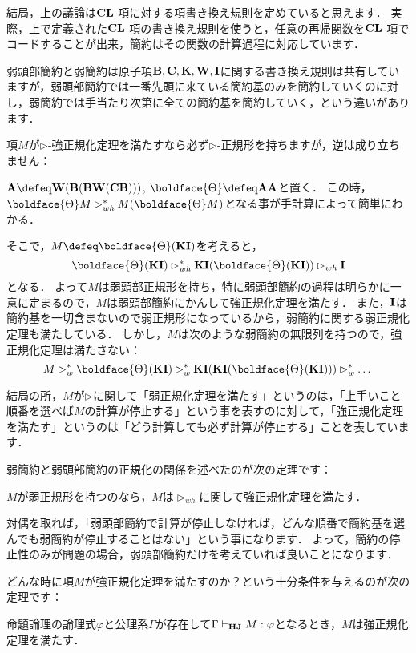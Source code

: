 \documentclass[realisability.tex]{subfiles}
\begin{document}
結局，上の議論は$\mathord{\mathbf{CL}}$-項に対する項書き換え規則を定めていると思えます．
実際，上で定義された$\mathord{\mathbf{CL}}$-項の書き換え規則を使うと，任意の再帰関数を$\mathord{\mathbf{CL}}$-項でコードすることが出来，簡約はその関数の計算過程に対応しています．

弱頭部簡約と弱簡約は原子項$\mathsf{\mathbf{B}}, \mathsf{\mathbf{C}}, \mathsf{\mathbf{K}}, \mathsf{\mathbf{W}}, \mathsf{\mathbf{I}}$に関する書き換え規則は共有していますが，弱頭部簡約では一番先頭に来ている簡約基のみを簡約していくのに対し，弱簡約では手当たり次第に全ての簡約基を簡約していく，という違いがあります．

項$M$が$\rhd$-強正規化定理を満たすなら必ず$\rhd$-正規形を持ちますが，逆は成り立ちません：

\begin{example}
 $\comb{A} \defeq \W(\B(\B\W(\C\B)))$, $\boldface{\Theta} \defeq \comb{A}\comb{A}$と置く．
 この時，$\boldface{\Theta} M \rhd_{wh}^* M (\boldface{\Theta} M)$となる事が手計算によって簡単にわかる．

 そこで，$M \defeq \boldface{\Theta} (\K\I)$を考えると，
 \[
  \boldface{\Theta}(\K\I) \rhd_{wh}^* \K \I (\boldface{\Theta} (\K\I)) \rhd_{wh} \I
 \]
 となる．
 よって$M$は弱頭部正規形を持ち，特に弱頭部簡約の過程は明らかに一意に定まるので，$M$は弱頭部簡約にかんして強正規化定理を満たす．
 また，$\mathsf{\mathbf{I}}$は簡約基を一切含まないので弱正規形になっているから，弱簡約に関する弱正規化定理も満たしている．
 しかし，$M$は次のような弱簡約の無限列を持つので，強正規化定理は満たさない：
 \[
  M \rhd_{w}^* \boldface{\Theta}(\K\I)
    \rhd_{w}^* \K\I(\K\I(\boldface{\Theta}(\K\I)))
    \rhd_w^* \dots
 \]
\end{example}

結局の所，$M$が$\rhd$に関して「弱正規化定理を満たす」というのは，「上手いこと順番を選べば$M$の計算が停止する」という事を表すのに対して，「強正規化定理を満たす」というのは「どう計算しても必ず計算が停止する」ことを表しています．

弱簡約と弱頭部簡約の正規化の関係を述べたのが次の定理です：
\begin{theorem}\label{thm:normal-wh-w}
 $M$が弱正規形を持つのなら，$M$は$\rhd_{wh}$に関して強正規化定理を満たす．
\end{theorem}
対偶を取れば，「弱頭部簡約で計算が停止しなければ，どんな順番で簡約基を選んでも弱簡約が停止することはない」という事になります．
よって，簡約の停止性のみが問題の場合，弱頭部簡約だけを考えていれば良いことになります．

どんな時に項$M$が強正規化定理を満たすのか？という十分条件を与えるのが次の定理です：

\begin{theorem}
 命題論理の論理式$\varphi$と公理系$\Gamma$が存在して$\Gamma \vdash_{\mathord{\mathbf{HJ}}} M: \varphi$となるとき，$M$は強正規化定理を満たす．
\end{theorem}
\end{document}
